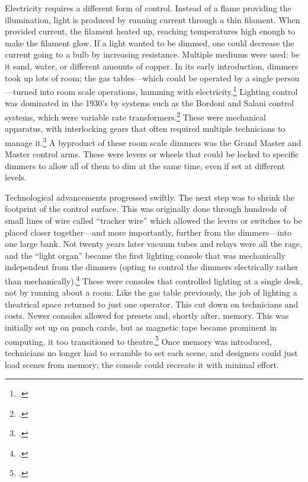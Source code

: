 \documentclass[
    12pt,
    twoside,
    bibstyle=chicago,
    headerstyle=uppercase,
	bibfile=biblatex_updating.bib
]{reedthesis}
\begin{document}

Electricity requires a different form of control. Instead of a flame providing the illumination, light is produced by running current through a thin filament. When provided current, the filament heated up, reaching temperatures high enough to make the filament glow. If a light wanted to be dimmed, one could decrease the current going to a bulb by increasing resistance. Multiple mediums were used: be it sand, water, or different amounts of copper. In its early introduction, dimmers took up lots of room; the gas tables---which could be operated by a single person---turned into room scale operations, humming with electricity.\footcite[p. 179]{pilbrowStageLightingDesign1997} Lighting control was dominated in the 1930's by systems such as the Bordoni and Salani control systems, which were variable rate transformers.\footcite[p. 207]{kellerLightFantasticArt2006} These were mechanical apparatus, with interlocking gears that often required multiple technicians to manage it.\footcite[p. 84-89]{benthamStageLighting1980} A byproduct of these room scale dimmers was the Grand Master and Master control arms. These were levers or wheels that could be locked to specific dimmers to allow all of them to dim at the same time, even if set at different levels.

Technological advancements progressed swiftly. The next step was to shrink the footprint of the control surface. This was originally done through hundreds of small lines of wire called “tracker wire” which allowed the levers or switches to be placed closer together---and more importantly, further from the dimmers---into one large bank. Not twenty years later vacuum tubes and relays were all the rage, and the “light organ” became the first lighting console that was mechanically independent from the dimmers (opting to control the dimmers electrically rather than mechanically).\footcite[480]{kellerLightFantasticArt2006} These were consoles that controlled lighting at a single desk, not by running about a room. Like the gas table previously, the job of lighting a theatrical space returned to just one operator. This cut down on technicians and costs. Newer consoles allowed for presets and, shortly after, memory. This was initially set up on punch cards, but as magnetic tape became prominent in computing, it too transitioned to theatre.\footcite[481]{kellerLightFantasticArt2006} Once memory was introduced, technicians no longer had to scramble to set each scene, and designers could just load scenes from memory; the console could recreate it with minimal effort.
\end{document}
